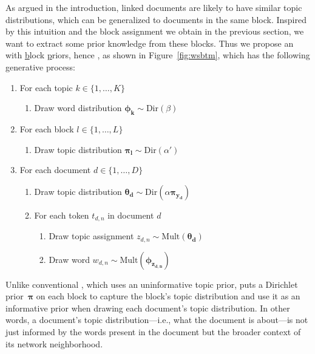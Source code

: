 As argued in the introduction, linked documents are likely to have
similar topic distributions, which can be generalized to documents in
the same block.  Inspired by this intuition and the block assignment
we obtain in the previous section, we want to extract some prior
knowledge from these blocks.  Thus we propose an \lda with \underline{b}lock \underline{p}riors, hence \bplda, as shown in
Figure~\ref{fig:wsbtm}, which has the following generative process:\par\nobreak
\begin{small}
\begin{enumerate}[leftmargin=*,noitemsep]
\item For each topic $k \in \{1,\ldots,K\}$
    \begin{enumerate}
    \item Draw word distribution $\bm{\phi_k} \sim \mathrm{Dir}(\beta)$
    \end{enumerate}
\item For each block $l\in \{1,\ldots,L\}$
    \begin{enumerate}
    \item Draw topic distribution $\bm{\pi_l}\sim \mathrm{Dir}(\alpha')$
    \end{enumerate}
\item For each document $d\in \{1,\ldots,D\}$
    \begin{enumerate}
    \item Draw topic distribution $\bm{\theta_d}\sim \mathrm{Dir}(\alpha \bm{\pi_{y_d}})$
    \item For each token $t_{d,n}$ in document $d$
        \begin{enumerate}
        \item Draw topic assignment $z_{d,n}\sim \mathrm{Mult}(\bm{\theta_d})$
        \item Draw word $w_{d,n}\sim \mathrm{Mult}(\bm{\phi_{z_{d,n}}})$
        \end{enumerate}
    \end{enumerate}
\end{enumerate}
\end{small}

Unlike conventional \lda, which uses an uninformative topic prior, \bplda puts a
Dirichlet prior~$\bm{\pi}$ on each block to capture the block's topic
distribution and use it as an informative prior when drawing each document's
topic distribution.  In other words, a document's topic distribution---i.e.,
what the document is about---is not just informed by the words present in the
document but the broader context of its network neighborhood.

